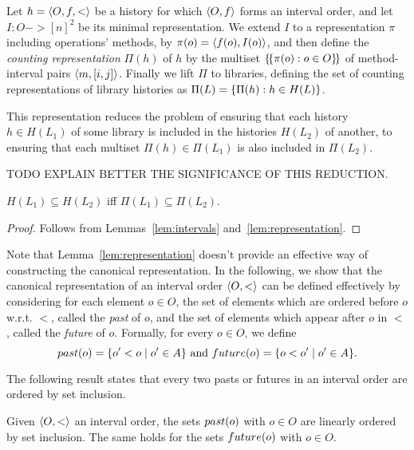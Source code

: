 Let $h = \left\langle {O,f,<} \right\rangle$ be a history for which $\left\langle {O,f} \right\rangle$ forms an interval
order, and let $I : O -> [n]^2$ be its minimal representation. We extend $I$ to
a representation $\pi$ including operations' methods, by $\pi(o) =
\left\langle {f(o),I(o)} \right\rangle$, and then define the \emph{counting representation} $\Pi(h)$
of $h$ by the multiset ${\{\!\{  \pi(o) : o \in O  \}\!\}}$ of method-interval pairs
$\left\langle {m,[i,j]} \right\rangle$. Finally we lift $\Pi$ to libraries, defining the set of
counting representations of library histories as $\Pi(L) = {\{  \Pi(h) : h \in
H(L)  \}}$.

This representation reduces the problem of ensuring that each history $h \in
H(L_1)$ of some library is included in the histories $H(L_2)$ of another, to
ensuring that each multiset $\Pi(h) \in \Pi(L_1)$ is also included in
$\Pi(L_2)$.

TODO EXPLAIN BETTER THE SIGNIFICANCE OF THIS REDUCTION.

\begin{lemma}

  $H(L_1) \subseteq H(L_2)$ iff $\Pi(L_1) \subseteq \Pi(L_2)$.

\end{lemma}

\begin{proof}

  Follows from Lemmas~\ref{lem:intervals} and~\ref{lem:representation}.

\end{proof}

Note that Lemma~\ref{lem:representation} doesn't provide an effective way of
constructing the canonical representation. In the following, we show that the
canonical representation of an interval order $\left\langle {O,<} \right\rangle$ can be defined
effectively by considering for each element $o\in O$, the set of elements which
are ordered before $o$ w.r.t. $<$, called the \emph{past} of $o$, and the set
of elements which appear after $o$ in $<$, called the \emph{future} of $o$.
Formally, for every $o\in O$, we define
\[
past({o})=\{o' < o\mid o'\in A\}\mbox{ and }future({o})=\{o < o'\mid o'\in A\}.
\]

The following result states that every two pasts or futures in an interval
order are ordered by set inclusion.

\begin{lemma}

  Given $\left\langle {O,<} \right\rangle$ an interval order, the sets $past({o})$ with $o\in O$ are
  linearly ordered by set inclusion. The same holds for the sets $future({o})$
  with $o\in O$.

\end{lemma}

